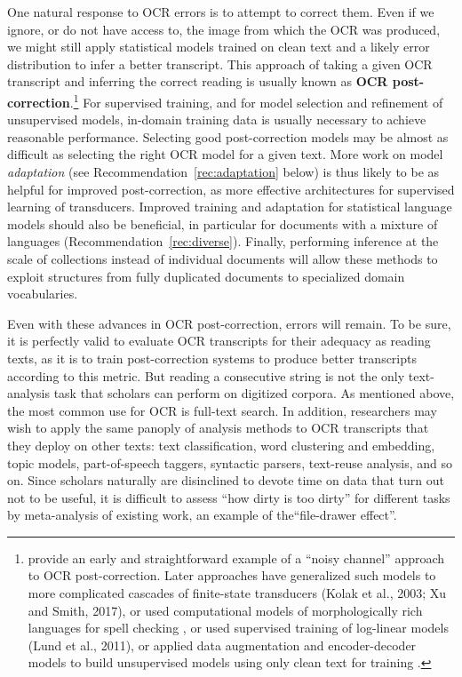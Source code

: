 \documentclass[twoside,11pt]{report}
\begin{document}
One natural response to OCR errors is to attempt to correct them. Even if we ignore, or do not have access to, the image from which the OCR was produced, we might still apply statistical models trained on clean text and a likely error distribution to infer a better transcript. This approach of taking a given OCR transcript and inferring the correct reading is usually known as \textbf{OCR post-correction}.\footnote{\cite{tong96:_statis_approac_autom_ocr_error_correc_contex} provide an early and straightforward example of a ``noisy channel'' approach to OCR post-correction. Later approaches have generalized such models to more complicated cascades of finite-state transducers (Kolak et al., 2003; Xu and Smith, 2017), or used computational models of morphologically rich languages for spell checking \citep{boschetti09:_improv_ocr_accur_class_critic_edition}, or used supervised training of log-linear models (Lund et al., 2011), or applied data augmentation and encoder-decoder models to build unsupervised models using only clean text for training \citep{dong18:acl}.}  For supervised training, and for model selection and refinement of unsupervised models, in-domain training data is usually necessary to achieve reasonable performance. Selecting good post-correction models may be almost as difficult as selecting the right OCR model for a given text. More work on model \emph{adaptation} (see Recommendation~\ref{rec:adaptation} below) is thus likely to be as helpful for improved post-correction, as more effective architectures for supervised learning of transducers. Improved training and adaptation for statistical language models should also be beneficial, in particular for documents with a mixture of languages (Recommendation~\ref{rec:diverse}). Finally, performing inference at the scale of collections instead of individual documents will allow these methods to exploit structures from fully duplicated documents to specialized domain vocabularies.

Even with these advances in OCR post-correction, errors will remain. To be sure, it is perfectly valid to evaluate OCR transcripts for their adequacy as reading texts, as it is to train post-correction systems to produce better transcripts according to this metric. But reading a consecutive string is not the only text-analysis task that scholars can perform on digitized corpora. As mentioned above, the most common use for OCR is full-text search. In addition, researchers may wish to apply the same panoply of analysis methods to OCR transcripts that they deploy on other texts: text classification, word clustering and embedding, topic models, part-of-speech taggers, syntactic parsers, text-reuse analysis, and so on. Since scholars naturally are disinclined to devote time on data that turn out not to be useful, it is difficult to assess ``how dirty is too dirty'' for different tasks by meta-analysis of existing work, an example of the``file-drawer effect''.
\end{document}
